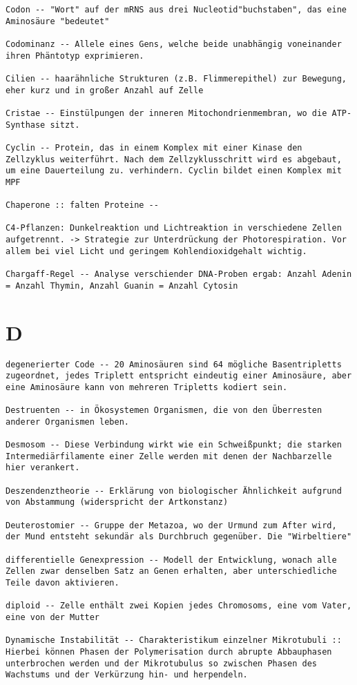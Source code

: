 \documentclass{article}
\begin{document}
\begin{verbatim}
Codon -- "Wort" auf der mRNS aus drei Nucleotid"buchstaben", das eine Aminosäure "bedeutet"

Codominanz -- Allele eines Gens, welche beide unabhängig voneinander ihren Phäntotyp exprimieren.

Cilien -- haarähnliche Strukturen (z.B. Flimmerepithel) zur Bewegung, eher kurz und in großer Anzahl auf Zelle

Cristae -- Einstülpungen der inneren Mitochondrienmembran, wo die ATP-Synthase sitzt.

Cyclin -- Protein, das in einem Komplex mit einer Kinase den Zellzyklus weiterführt. Nach dem Zellzyklusschritt wird es abgebaut, um eine Dauerteilung zu. verhindern. Cyclin bildet einen Komplex mit MPF 

Chaperone :: falten Proteine -- 

C4-Pflanzen: Dunkelreaktion und Lichtreaktion in verschiedene Zellen aufgetrennt. -> Strategie zur Unterdrückung der Photorespiration. Vor allem bei viel Licht und geringem Kohlendioxidgehalt wichtig.

Chargaff-Regel -- Analyse verschiender DNA-Proben ergab: Anzahl Adenin = Anzahl Thymin, Anzahl Guanin = Anzahl Cytosin

\end{verbatim}
\newpage


\section{D}
\begin{verbatim}
degenerierter Code -- 20 Aminosäuren sind 64 mögliche Basentripletts zugeordnet, jedes Triplett entspricht eindeutig einer Aminosäure, aber eine Aminosäure kann von mehreren Tripletts kodiert sein.

Destruenten -- in Ökosystemen Organismen, die von den Überresten anderer Organismen leben.

Desmosom -- Diese Verbindung wirkt wie ein Schweißpunkt; die starken Intermediärfilamente einer Zelle werden mit denen der Nachbarzelle hier verankert.

Deszendenztheorie -- Erklärung von biologischer Ähnlichkeit aufgrund von Abstammung (widerspricht der Artkonstanz)

Deuterostomier -- Gruppe der Metazoa, wo der Urmund zum After wird, der Mund entsteht sekundär als Durchbruch gegenüber. Die "Wirbeltiere"

differentielle Genexpression -- Modell der Entwicklung, wonach alle Zellen zwar denselben Satz an Genen erhalten, aber unterschiedliche Teile davon aktivieren.

diploid -- Zelle enthält zwei Kopien jedes Chromosoms, eine vom Vater, eine von der Mutter

Dynamische Instabilität -- Charakteristikum einzelner Mikrotubuli ::  Hierbei können Phasen der Polymerisation durch abrupte Abbauphasen unterbrochen werden und der Mikrotubulus so zwischen Phasen des Wachstums und der Verkürzung hin- und herpendeln.
\end{verbatim}
\newpage
\end{document}
